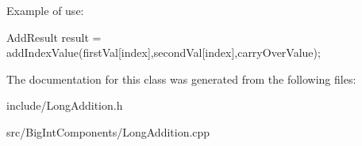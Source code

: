 Example of use\+: 
\begin{DoxyCode}
AddResult result = addIndexValue(firstVal[index],secondVal[index],carryOverValue);
\end{DoxyCode}
 

The documentation for this class was generated from the following files\+:\begin{DoxyCompactItemize}
\item 
include/Long\+Addition.\+h\item 
src/\+Big\+Int\+Components/Long\+Addition.\+cpp\end{DoxyCompactItemize}
